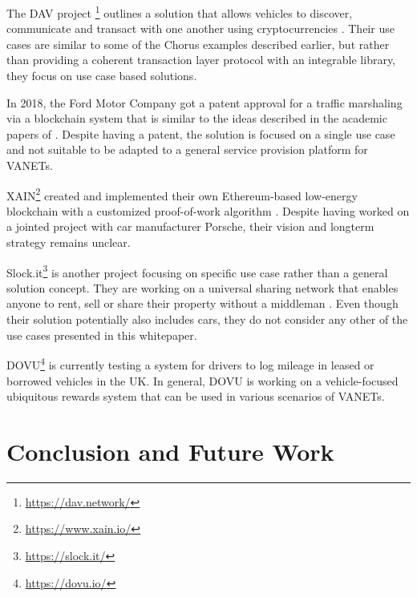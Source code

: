 \documentclass{llncs}
\begin{document}
{			The DAV project \footnote{\url{https://dav.network/}} outlines a solution that allows vehicles to discover, communicate and transact with one another using cryptocurrencies \cite{davWhitepaper}. Their use cases are similar to some of the Chorus examples described earlier, but rather than providing a coherent transaction layer protocol with an integrable library, they focus on use case based solutions.
			
			In 2018, the Ford Motor Company got a patent approval for a traffic marshaling via a blockchain system \cite{macneille2018vehicle} that is similar to the ideas described in the academic papers of \cite{leiding2016self}. Despite having a patent, the solution is focused on a single use case and not suitable to be adapted to a general service provision platform for VANETs. 

			XAIN\footnote{\url{https://www.xain.io/}} created and implemented their own Ethereum-based low-energy blockchain with a customized proof-of-work algorithm \cite{xainWhitepaper}. Despite having worked on a jointed project with car manufacturer Porsche, their vision and longterm strategy remains unclear.

			Slock.it\footnote{\url{https://slock.it/}} is another project focusing on specific use case rather than a general solution concept. They are working on a universal sharing network that enables anyone to rent, sell or share their property without a middleman \cite{slockWhitepaper}. Even though their solution potentially also includes cars, they do not consider any other of the use cases presented in this whitepaper.

			DOVU\footnote{\url{https://dovu.io/}} \cite{dovuWhitepaper} is currently testing a system for drivers to log mileage in leased or borrowed vehicles in the UK. In general, DOVU is working on a vehicle-focused ubiquitous rewards system that can be used in various scenarios of VANETs.
			
			
			
			
		
		
	

	\section{Conclusion and Future Work}
		\label{s:section-8}	

}
\end{document}

